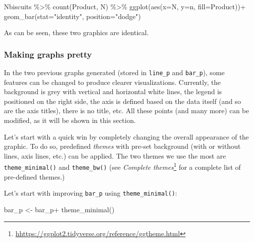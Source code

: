 \documentclass[
]{krantz}
\makeatletter
\newenvironment{Shaded}{\begin{snugshade}}{\end{snugshade}}
\newcommand{\AttributeTok}[1]{\textcolor[rgb]{0.61,0.61,0.61}{#1}}
\newcommand{\FunctionTok}[1]{\textcolor[rgb]{0,0,0}{#1}}
\newcommand{\NormalTok}[1]{#1}
\newcommand{\OtherTok}[1]{\textcolor[rgb]{0.37,0.37,0.37}{#1}}
\newcommand{\SpecialCharTok}[1]{\textcolor[rgb]{0,0,0}{#1}}
\newcommand{\StringTok}[1]{\textcolor[rgb]{0.5,0.5,0.5}{#1}}
\renewcommand{\href}[2]{#2\footnote{\url{#1}}}
\newenvironment{kframe}{%
\medskip{}
\setlength{\fboxsep}{.8em}
 \def\at@end@of@kframe{}%
 \ifinner\ifhmode%
  \def\at@end@of@kframe{\end{minipage}}%
  \begin{minipage}{\columnwidth}%
 \fi\fi%
 \def\FrameCommand##1{\hskip\@totalleftmargin \hskip-\fboxsep
 \colorbox{shadecolor}{##1}\hskip-\fboxsep
     \hskip-\linewidth \hskip-\@totalleftmargin \hskip\columnwidth}%
 \MakeFramed {\advance\hsize-\width
   \@totalleftmargin\z@ \linewidth\hsize
   \@setminipage}}%
 {\par\unskip\endMakeFramed%
 \at@end@of@kframe}
\renewenvironment{Shaded}{\begin{kframe}}{\end{kframe}}
\makeatother
\begin{document}
\begin{Shaded}
\begin{Highlighting}[]
\NormalTok{Nbiscuits }\SpecialCharTok{\%\textgreater{}\%} 
  \FunctionTok{count}\NormalTok{(Product, N) }\SpecialCharTok{\%\textgreater{}\%} 
  \FunctionTok{ggplot}\NormalTok{(}\FunctionTok{aes}\NormalTok{(}\AttributeTok{x=}\NormalTok{N, }\AttributeTok{y=}\NormalTok{n, }\AttributeTok{fill=}\NormalTok{Product))}\SpecialCharTok{+}
  \FunctionTok{geom\_bar}\NormalTok{(}\AttributeTok{stat=}\StringTok{"identity"}\NormalTok{, }\AttributeTok{position=}\StringTok{"dodge"}\NormalTok{)}
\end{Highlighting}
\end{Shaded}

As can be seen, these two graphics are identical.

\hypertarget{prettygrphs}{%
\subsubsection*{Making graphs pretty}\label{prettygrphs}}


In the two previous graphs generated (stored in \texttt{line\_p} and \texttt{bar\_p}), some features can be changed to produce clearer visualizations. Currently, the background is grey with vertical and horizontal white lines, the legend is positioned on the right side, the axis is defined based on the data itself (and so are the axis titles), there is no title, etc. All these points (and many more) can be modified, as it will be shown in this section.

Let's start with a quick win by completely changing the overall appearance of the graphic. To do so, predefined \emph{themes} with pre-set background (with or without lines, axis lines, etc.) can be applied. The two themes we use the most are \texttt{theme\_minimal()} and \texttt{theme\_bw()} (see \href{hhttps://ggplot2.tidyverse.org/reference/ggtheme.html}{\emph{Complete themes}} for a complete list of pre-defined themes.)

Let's start with improving \texttt{bar\_p} using \texttt{theme\_minimal()}:

\begin{Shaded}
\begin{Highlighting}[]
\NormalTok{bar\_p }\OtherTok{\textless{}{-}}\NormalTok{ bar\_p}\SpecialCharTok{+}
  \FunctionTok{theme\_minimal}\NormalTok{()}
\end{Highlighting}
\end{Shaded}
\end{document}
